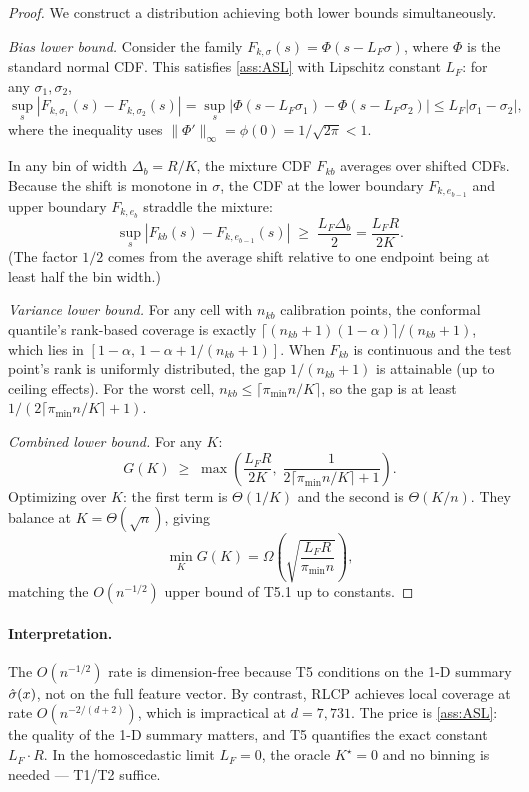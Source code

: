 \begin{proof}
We construct a distribution achieving both lower bounds simultaneously.

\textit{Bias lower bound.}
Consider the family $F_{k,\sigma}(s) = \Phi(s - L_F \sigma)$, where $\Phi$ is the standard normal CDF. This satisfies \ref{ass:ASL} with Lipschitz constant $L_F$: for any $\sigma_1, \sigma_2$,
\[
\sup_s |F_{k,\sigma_1}(s) - F_{k,\sigma_2}(s)|
= \sup_s |\Phi(s - L_F \sigma_1) - \Phi(s - L_F \sigma_2)|
\leq L_F |\sigma_1 - \sigma_2|,
\]
where the inequality uses $\|\Phi'\|_\infty = \phi(0) = 1/\sqrt{2\pi} < 1$.

In any bin of width $\Delta_b = R/K$, the mixture CDF $F_{kb}$ averages over shifted CDFs. Because the shift is monotone in $\sigma$, the CDF at the lower boundary $F_{k, e_{b-1}}$ and upper boundary $F_{k, e_b}$ straddle the mixture:
\[
\sup_s |F_{kb}(s) - F_{k, e_{b-1}}(s)| \;\geq\; \frac{L_F \Delta_b}{2} = \frac{L_F R}{2K}.
\]
(The factor $1/2$ comes from the average shift relative to one endpoint being at least half the bin width.)

\textit{Variance lower bound.}
For any cell with $n_{kb}$ calibration points, the conformal quantile's rank-based coverage is exactly $\lceil (n_{kb} + 1)(1-\alpha)\rceil / (n_{kb} + 1)$, which lies in $[1-\alpha,\, 1-\alpha + 1/(n_{kb} + 1)]$. When $F_{kb}$ is continuous and the test point's rank is uniformly distributed, the gap $1/(n_{kb} + 1)$ is attainable (up to ceiling effects). For the worst cell, $n_{kb} \leq \lceil \pi_{\min} n / K \rceil$, so the gap is at least $1/(2 \lceil \pi_{\min} n / K \rceil + 1)$.

\textit{Combined lower bound.}
For any $K$:
\[
G(K) \;\geq\; \max\!\left(\frac{L_F R}{2K},\; \frac{1}{2 \lceil \pi_{\min} n / K \rceil + 1}\right).
\]
Optimizing over $K$: the first term is $\Theta(1/K)$ and the second is $\Theta(K/n)$. They balance at $K = \Theta(\sqrt{n})$, giving
\[
\min_K G(K) = \Omega\!\left(\sqrt{\frac{L_F R}{\pi_{\min} n}}\right),
\]
matching the $O(n^{-1/2})$ upper bound of T5.1 up to constants.
\end{proof}

\paragraph{Interpretation.}
The $O(n^{-1/2})$ rate is dimension-free because T5 conditions on the 1-D summary $\hat{\sigma}(x)$, not on the full feature vector. By contrast, RLCP \citep{hore2025rlcp} achieves local coverage at rate $O(n^{-2/(d+2)})$, which is impractical at $d = 7{,}731$. The price is \ref{ass:ASL}: the quality of the 1-D summary matters, and T5 quantifies the exact constant $L_F \cdot R$. In the homoscedastic limit $L_F = 0$, the oracle $K^\star = 0$ and no binning is needed --- T1/T2 suffice.
